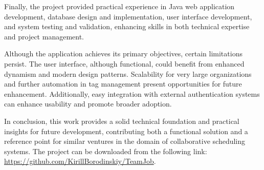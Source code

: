 Finally, the project provided practical experience in Java web application development, database design and implementation, user interface development, and system testing and validation, enhancing skills in both technical expertise and project management.

Although the application achieves its primary objectives, certain limitations persist.
The user interface, although functional, could benefit from enhanced dynamism and modern design patterns.
Scalability for very large organizations and further automation in tag management present opportunities for future enhancement.
Additionally, easy integration with external authentication systems can enhance usability and promote broader adoption.

In conclusion, this work provides a solid technical foundation and practical insights for future development, contributing both a functional solution and a reference point for similar ventures in the domain of collaborative scheduling systems.
The project can be downloaded from the following link: \url{https://github.com/KirillBorodinskiy/TeamJob}.